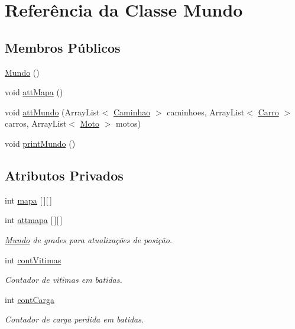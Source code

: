\hypertarget{class_mundo}{}\section{Referência da Classe Mundo}
\label{class_mundo}
\subsection*{Membros Públicos}
\begin{DoxyCompactItemize}
\item 
\mbox{\hyperlink{class_mundo_ae3801a0a633ad3475456c67639561105}{Mundo}} ()
\item 
void \mbox{\hyperlink{class_mundo_af5231bba26317e2ff2eb04e9bf0ac495}{att\+Mapa}} ()
\item 
void \mbox{\hyperlink{class_mundo_a6992f445c8947937e73492a0ac6895fa}{att\+Mundo}} (Array\+List$<$ \mbox{\hyperlink{class_caminhao}{Caminhao}} $>$ caminhoes, Array\+List$<$ \mbox{\hyperlink{class_carro}{Carro}} $>$ carros, Array\+List$<$ \mbox{\hyperlink{class_moto}{Moto}} $>$ motos)
\item 
void \mbox{\hyperlink{class_mundo_abe2d4fb96005c19b423cc6163bf986f5}{print\+Mundo}} ()
\end{DoxyCompactItemize}
\subsection*{Atributos Privados}
\begin{DoxyCompactItemize}
\item 
int \mbox{\hyperlink{class_mundo_a8332b2d52b9f317338a4d6cbe10bbcbb}{mapa}} \mbox{[}$\,$\mbox{]}\mbox{[}$\,$\mbox{]}
\item 
\mbox{\label{class_mundo_afccad9fd3eda103dc801ffaf2c391e1a}} 
int \mbox{\hyperlink{class_mundo_afccad9fd3eda103dc801ffaf2c391e1a}{attmapa}} \mbox{[}$\,$\mbox{]}\mbox{[}$\,$\mbox{]}
\begin{DoxyCompactList}\small\item\em \mbox{\hyperlink{class_mundo}{Mundo}} de grades para atualizações de posição. \end{DoxyCompactList}\item 
\mbox{\label{class_mundo_afa552f3d464f7372e35f182ad60f0e2c}} 
int \mbox{\hyperlink{class_mundo_afa552f3d464f7372e35f182ad60f0e2c}{cont\+Vitimas}}
\begin{DoxyCompactList}\small\item\em Contador de vitimas em batidas. \end{DoxyCompactList}\item 
\mbox{\label{class_mundo_a6289b5c83662e0f64c6d673983581dc3}} 
int \mbox{\hyperlink{class_mundo_a6289b5c83662e0f64c6d673983581dc3}{cont\+Carga}}
\begin{DoxyCompactList}\small\item\em Contador de carga perdida em batidas. \end{DoxyCompactList}\end{DoxyCompactItemize}


